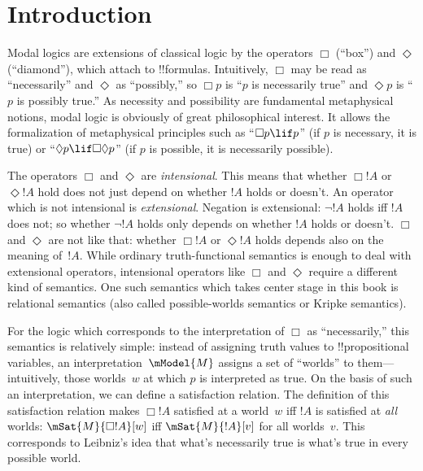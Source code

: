 
\chapter{Introduction}

Modal logics are extensions of classical logic by the operators $\Box$
(``box'') and $\Diamond$ (``diamond''), which attach to !!{formula}s.
Intuitively, $\Box$ may be read as ``necessarily'' and $\Diamond$ as
``possibly,'' so $\Box p$ is ``$p$ is necessarily true'' and $\Diamond
p$ is ``$p$ is possibly true.'' As necessity and possibility are
fundamental metaphysical notions, modal logic is obviously of great
philosophical interest. It allows the formalization of metaphysical
principles such as ``$\Box p \lif p$'' (if $p$ is necessary, it is
true) or ``$\Diamond p \lif \Box\Diamond p$'' (if $p$ is possible,
it is necessarily possible).

The operators $\Box$ and $\Diamond$ are \emph{intensional}. This means
that whether $\Box !A$ or $\Diamond !A$ hold does not just depend on
whether $!A$ holds or doesn't.  An operator which is not intensional
is \emph{extensional}. Negation is extensional: $\lnot !A$ holds iff
$!A$ does not; so whether $\lnot !A$ holds only depends on whether
$!A$ holds or doesn't. $\Box$ and $\Diamond$ are not like that:
whether $\Box !A$ or $\Diamond !A$ holds depends also on the meaning
of~$!A$.  While ordinary truth-functional semantics is enough to deal
with extensional operators, intensional operators like $\Box$ and
$\Diamond$ require a different kind of semantics. One such semantics
which takes center stage in this book is relational semantics (also
called possible-worlds semantics or Kripke semantics). 

For the logic which corresponds to the interpretation of $\Box$ as
``necessarily,'' this semantics is relatively simple: instead of
assigning truth values to !!{propositional variable}s, an
interpretation~$\mModel{M}$ assigns a set of ``worlds'' to
them---intuitively, those worlds~$w$ at which $p$ is interpreted as true.
On the basis of such an interpretation, we can define a satisfaction
relation. The definition of this satisfaction relation makes $\Box !A$ satisfied at a world~$w$ iff $!A$ is
satisfied at \emph{all} worlds: $\mSat{M}{\Box !A}[w]$ iff
$\mSat{M}{!A}[v]$ for all worlds~$v$. This corresponds to Leibniz's
idea that what's necessarily true is what's true in every possible world.

